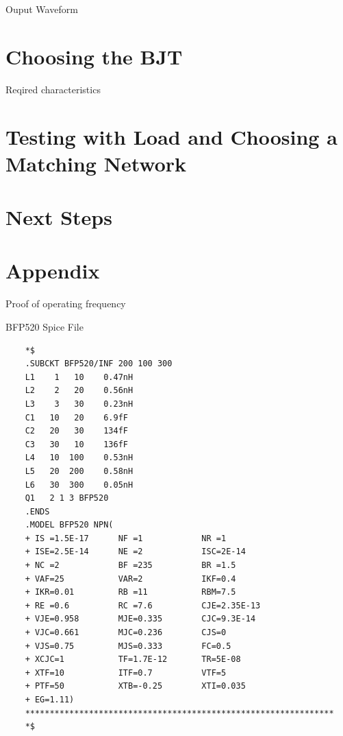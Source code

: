 \documentclass{beamer}
\begin{document}
\begin{frame}{Ouput Waveform}


\end{frame}




\section{Choosing the BJT}
\begin{frame}{Reqired characteristics}
  
\end{frame}




\section{Testing with Load and Choosing a Matching Network}



\section{Next Steps}

\section*{Appendix}


\begin{frame}{Proof of operating frequency}

\end{frame}

\begin{frame}[fragile]{BFP520 Spice File}
\begin{tiny}
  \begin{lstlisting}
    *$
    .SUBCKT BFP520/INF 200 100 300
    L1    1   10    0.47nH
    L2    2   20    0.56nH
    L3    3   30    0.23nH
    C1   10   20    6.9fF
    C2   20   30    134fF
    C3   30   10    136fF
    L4   10  100    0.53nH
    L5   20  200    0.58nH
    L6   30  300    0.05nH
    Q1   2 1 3 BFP520
    .ENDS
    .MODEL BFP520 NPN(
    + IS =1.5E-17      NF =1            NR =1
    + ISE=2.5E-14      NE =2            ISC=2E-14
    + NC =2            BF =235          BR =1.5
    + VAF=25           VAR=2            IKF=0.4
    + IKR=0.01         RB =11           RBM=7.5
    + RE =0.6          RC =7.6          CJE=2.35E-13
    + VJE=0.958        MJE=0.335        CJC=9.3E-14
    + VJC=0.661        MJC=0.236        CJS=0
    + VJS=0.75         MJS=0.333        FC=0.5
    + XCJC=1           TF=1.7E-12       TR=5E-08
    + XTF=10           ITF=0.7          VTF=5
    + PTF=50           XTB=-0.25        XTI=0.035
    + EG=1.11)
    ***************************************************************
    *$
  \end{lstlisting}
\end{tiny}

\end{frame}
\end{document}

